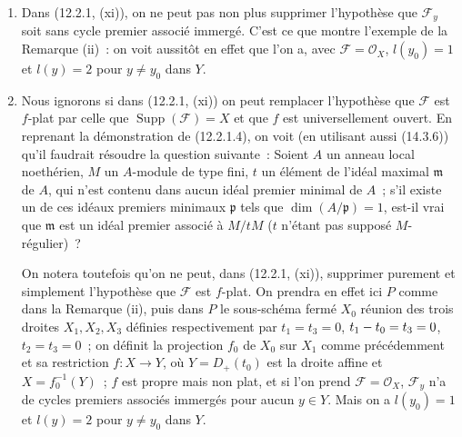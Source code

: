 \begin{remarks}[12.2.3]
\begin{enumerate}[label=(\roman*)]
  \item Dans (12.2.1, (xi)), on ne peut pas non plus supprimer l'hypothèse que
  $\mathcal F_y$ soit sans cycle premier associé immergé. C'est ce que montre
  l'exemple de la Remarque (ii)~: on voit aussitôt en effet que l'on a, avec
  $\mathcal F=\mathcal O_X$, $l(y_0)=1$ et $l(y)=2$ pour $y\neq y_0$ dans $Y$.

  \item Nous ignorons si dans (12.2.1, (xi)) on peut remplacer l'hypothèse que
  $\mathcal F$ est $f$-plat par celle que $\operatorname{Supp}(\mathcal F)=X$
  et que $f$ est universellement ouvert. En reprenant la démonstration de
  (12.2.1.4), on voit (en utilisant aussi (14.3.6)) qu'il faudrait résoudre la
  question suivante~: Soient $A$ un anneau local noethérien, $M$ un $A$-module
  de type fini, $t$ un élément de l'idéal maximal $\mathfrak m$ de $A$, qui
  n'est contenu dans aucun idéal premier minimal de $A$~; s'il existe un de ces
  idéaux premiers minimaux $\mathfrak p$ tels que $\dim(A/\mathfrak p)=1$,
  est-il vrai que $\mathfrak m$ est un idéal premier associé à $M/tM$ ($t$
  n'étant pas supposé $M$-régulier)~?

  On notera toutefois qu'on ne peut, dans (12.2.1, (xi)), supprimer purement et
  simplement l'hypothèse que $\mathcal F$ est $f$-plat. On prendra en effet ici
  $P$ comme dans la Remarque (ii), puis dans $P$ le sous-schéma fermé $X_0$
  réunion des trois droites $X_1,X_2,X_3$ définies respectivement par
  $t_1=t_3=0$, $t_1- t_0=t_3=0$, $t_2=t_3=0$~; on définit la projection $f_0$ de
  $X_0$ sur $X_1$ comme précédemment et sa restriction $f:X\to Y$, où
  $Y=D_+(t_0)$ est la droite affine et $X=f_0^{-1}(Y)$~; $f$ est propre mais
  non plat, et si l'on prend $\mathcal F=\mathcal O_X$, $\mathcal F_y$ n'a de
  cycles premiers associés immergés pour aucun $y\in Y$. Mais on a $l(y_0)=1$
  et $l(y)=2$ pour $y\neq y_0$ dans $Y$.
\end{enumerate}
\end{remarks}

